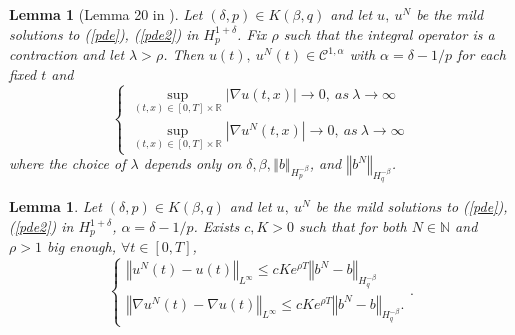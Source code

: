 \documentclass[12pt]{article}
\newtheorem{lem}[theo]{Lemma}
\newcommand{\norme}[1]{\left\Vert #1\right\Vert}
\newcommand{\R}{\mathbb{R}}
\newcommand{\N}{\mathbb{N}}
\begin{document}
    \begin{lem}[Lemma 20 in \cite{Fla-Iss-Rus-2017}]\label{lem}
        Let $(\delta,p)\in K(\beta,q)$ and let $u,\ u^N$ be the mild solutions to (\ref{pde}), (\ref{pde2}) in $H_p^{1+\delta}$. Fix $\rho$ such that the integral operator is a contraction and let $\lambda>\rho$. Then $u(t),\ u^N(t)\in\mathcal{C}^{1,\alpha}$ with $\alpha=\delta-1/p$ for each fixed $t$ and 
        \begin{equation*}
        \begin{cases}
        \underset{(t,x)\in[0,T]\times\R}{\sup} |\nabla u(t,x)| \rightarrow 0,\ as\ \lambda \rightarrow \infty \\
        \underset{(t,x)\in[0,T]\times\R}{\sup} |\nabla u^N(t,x)| \rightarrow 0,\ as\ \lambda \rightarrow \infty
        \end{cases}
        \end{equation*}
        where the choice of $\lambda$ depends only on $\delta,\beta,\norme{b}_{H_p^{-\beta}}$, and $\norme{b^N}_{H_q^{-\beta}}$.
    \end{lem}
    
    \begin{lem}\label{morrey} Let $(\delta,p)\in K(\beta,q)$ and let $u,\ u^N$ be the mild solutions to (\ref{pde}),(\ref{pde2}) in $H_p^{1+\delta}$, $\alpha = \delta - 1/p$. Exists $c,K>0$ such that for both $N\in\N$ and $\rho>1$ big enough, $\forall t\in[0,T]$,
        \begin{equation}
        \begin{cases}
        \norme{u^N(t) - u(t)}_{L^\infty}\leq cKe^{\rho T}\norme{b^N-b}_{H^{-\beta}_{q}}\\        
        \norme{\nabla u^N(t) - \nabla u(t)}_{L^\infty}\leq c Ke^{\rho T}\norme{b^N-b}_{H^{-\beta}_{q}}.
        \end{cases} .
        \end{equation}
    \end{lem}    
    
\end{document}
